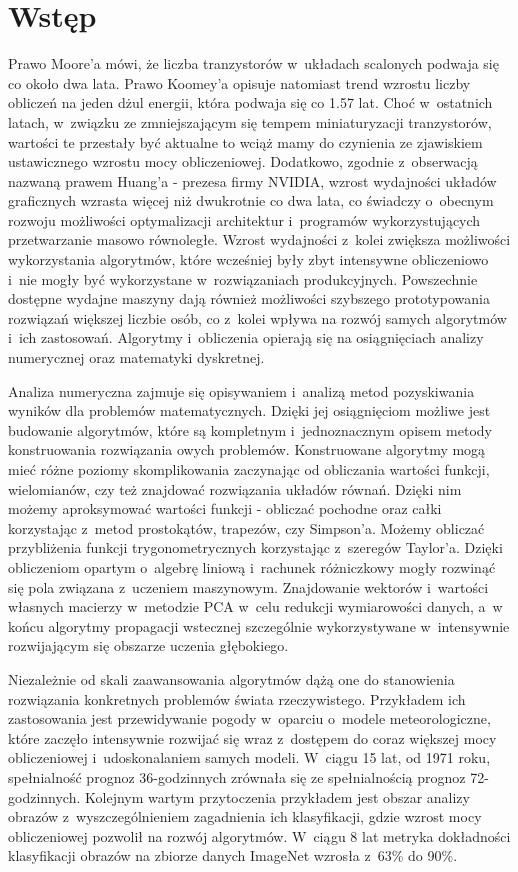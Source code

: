 \chapter{Wstęp}

Prawo Moore'a mówi, że liczba tranzystorów w~układach scalonych podwaja się co około dwa lata. Prawo Koomey'a opisuje natomiast trend wzrostu liczby obliczeń na jeden dżul energii, która podwaja się co 1.57 lat. Choć w~ostatnich latach, w~związku ze zmniejszającym się tempem miniaturyzacji tranzystorów, wartości te przestały być aktualne to wciąż mamy do czynienia ze zjawiskiem ustawicznego wzrostu mocy obliczeniowej. Dodatkowo, zgodnie z~obserwacją nazwaną prawem Huang'a - prezesa firmy NVIDIA, wzrost wydajności układów graficznych wzrasta więcej niż dwukrotnie co dwa lata\cite{tongo}, co świadczy o~obecnym rozwoju możliwości optymalizacji architektur i~programów wykorzystujących przetwarzanie masowo równoległe.  Wzrost wydajności z~kolei zwiększa możliwości wykorzystania algorytmów, które wcześniej były zbyt intensywne obliczeniowo i~nie mogły być wykorzystane w~rozwiązaniach produkcyjnych. Powszechnie dostępne wydajne maszyny dają również możliwości szybszego prototypowania rozwiązań większej liczbie osób, co z~kolei wpływa na rozwój samych algorytmów i~ich zastosowań. Algorytmy i~obliczenia opierają się na osiągnięciach analizy numerycznej oraz matematyki dyskretnej.

Analiza numeryczna zajmuje się opisywaniem i~analizą metod pozyskiwania wyników dla problemów matematycznych. Dzięki jej osiągnięciom możliwe jest budowanie algorytmów, które są kompletnym i~jednoznacznym opisem metody konstruowania rozwiązania owych problemów. Konstruowane algorytmy mogą mieć różne poziomy skomplikowania zaczynając od obliczania wartości funkcji, wielomianów, czy też znajdować rozwiązania układów równań. Dzięki nim możemy aproksymować wartości funkcji - obliczać pochodne oraz całki korzystając z~metod prostokątów, trapezów, czy Simpson'a. Możemy obliczać przybliżenia funkcji trygonometrycznych korzystając z~szeregów Taylor'a. Dzięki obliczeniom opartym o~algebrę liniową i~rachunek różniczkowy mogły rozwinąć się pola związana z~uczeniem maszynowym. Znajdowanie wektorów i~wartości własnych macierzy w~metodzie PCA w~celu redukcji wymiarowości danych, a~w końcu algorytmy propagacji wstecznej szczególnie wykorzystywane w~intensywnie rozwijającym się obszarze uczenia głębokiego\cite{phillips1996theory}.

Niezależnie od skali zaawansowania algorytmów dążą one do stanowienia rozwiązania konkretnych problemów świata rzeczywistego. Przykładem ich zastosowania jest przewidywanie pogody w~oparciu o~modele meteorologiczne, które zaczęło intensywnie rozwijać się wraz z~dostępem do coraz większej mocy obliczeniowej i~udoskonalaniem samych modeli. W~ciągu 15 lat, od 1971 roku, spełnialność prognoz 36-godzinnych zrównała się ze spełnialnością prognoz 72-godzinnych\cite{lynch2008origins}. Kolejnym wartym przytoczenia przykładem jest obszar analizy obrazów z~wyszczególnieniem zagadnienia ich klasyfikacji, gdzie wzrost mocy obliczeniowej pozwolił na rozwój algorytmów. W~ciągu 8 lat metryka dokładności klasyfikacji obrazów na zbiorze danych ImageNet wzrosła z~63\% do 90\%\cite{lynch2008origins,dai2021coatnet}.


